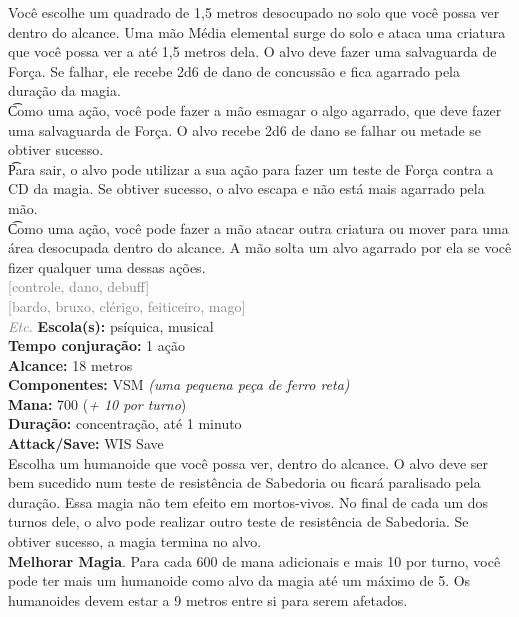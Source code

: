 \documentclass{RPG_Adventure}[2021/10/20]
\begin{document}
{\normalsize Você escolhe um quadrado de 1,5 metros desocupado no solo que você possa ver dentro do alcance. Uma mão Média elemental surge do solo e ataca uma criatura que você possa ver a até 1,5 metros dela. O alvo deve fazer uma salvaguarda de Força. Se falhar, ele recebe 2d6 de dano de concussão e fica agarrado pela duração da magia.\\\t Como uma ação, você pode fazer a mão esmagar o algo agarrado, que deve fazer uma salvaguarda de Força. O alvo recebe 2d6 de dano se falhar ou metade se obtiver sucesso.\\\t Para sair, o alvo pode utilizar a sua ação para fazer um teste de Força contra a CD da magia. Se obtiver sucesso, o alvo escapa e não está mais agarrado pela mão.\\\t Como uma ação, você pode fazer a mão atacar outra criatura ou mover para uma área desocupada dentro do alcance. A mão solta um alvo agarrado por ela se você fizer qualquer uma dessas ações.\\}
{\scriptsize \textcolor{gray}{[controle, dano, debuff]\\}}
{\scriptsize \textcolor{gray}{[bardo, bruxo, clérigo, feiticeiro, mago]\\}}
{\tiny \textcolor{gray}{\textit{Etc.}}}
{\small \t \textbf{Escola(s):} psíquica, musical\\\t \textbf{Tempo conjuração:} 1 ação\\\t \textbf{Alcance:} 18 metros\\\t \textbf{Componentes:} VSM \textit{(uma pequena peça de ferro reta)}\\\t \textbf{Mana:} 700 (\textit{+ 10 por turno})\\\t \textbf{Duração:} concentração, até 1 minuto\\\t \textbf{Attack/Save:} WIS Save\\}
{\normalsize Escolha um humanoide que você possa ver, dentro do alcance. O alvo deve ser bem sucedido num teste de resistência de Sabedoria ou ficará paralisado pela duração. Essa magia não tem efeito em mortos-vivos. No final de cada um dos turnos dele, o alvo pode realizar outro teste de resistência de Sabedoria. Se obtiver sucesso, a magia termina no alvo.\\\t \textbf{Melhorar Magia}. Para cada 600 de mana adicionais e mais 10 por turno, você pode ter mais um humanoide como alvo da magia até um máximo de 5. Os humanoides devem estar a 9 metros entre si para serem afetados.\\}
\end{document}
